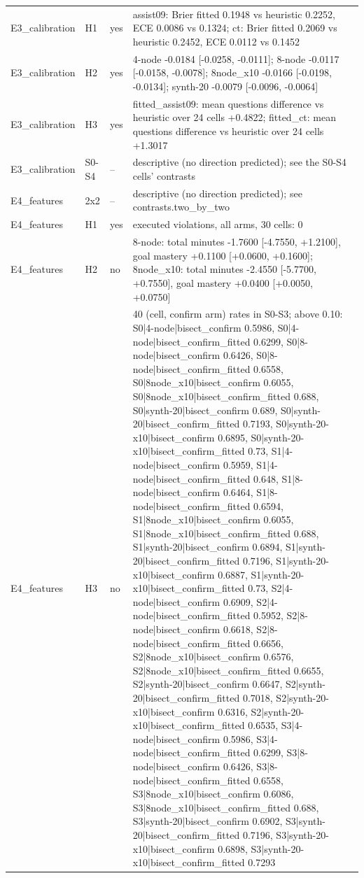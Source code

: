 \begin{table}[htbp]
\begin{tabular}{llll}
E3\_calibration & H1 & yes & assist09: Brier fitted 0.1948 vs heuristic 0.2252, ECE 0.0086 vs 0.1324; ct: Brier fitted 0.2069 vs heuristic 0.2452, ECE 0.0112 vs 0.1452 \\
E3\_calibration & H2 & yes & 4-node -0.0184 [-0.0258, -0.0111]; 8-node -0.0117 [-0.0158, -0.0078]; 8node\_x10 -0.0166 [-0.0198, -0.0134]; synth-20 -0.0079 [-0.0096, -0.0064] \\
E3\_calibration & H3 & yes & fitted\_assist09: mean questions difference vs heuristic over 24 cells +0.4822; fitted\_ct: mean questions difference vs heuristic over 24 cells +1.3017 \\
E3\_calibration & S0-S4 & -- & descriptive (no direction predicted); see the S0-S4 cells' contrasts \\
E4\_features & 2x2 & -- & descriptive (no direction predicted); see contrasts.two\_by\_two \\
E4\_features & H1 & yes & executed violations, all arms, 30 cells: 0 \\
E4\_features & H2 & no & 8-node: total minutes -1.7600 [-4.7550, +1.2100], goal mastery +0.1100 [+0.0600, +0.1600]; 8node\_x10: total minutes -2.4550 [-5.7700, +0.7550], goal mastery +0.0400 [+0.0050, +0.0750] \\
E4\_features & H3 & no & 40 (cell, confirm arm) rates in S0-S3; above 0.10: S0|4-node|bisect\_confirm 0.5986, S0|4-node|bisect\_confirm\_fitted 0.6299, S0|8-node|bisect\_confirm 0.6426, S0|8-node|bisect\_confirm\_fitted 0.6558, S0|8node\_x10|bisect\_confirm 0.6055, S0|8node\_x10|bisect\_confirm\_fitted 0.688, S0|synth-20|bisect\_confirm 0.689, S0|synth-20|bisect\_confirm\_fitted 0.7193, S0|synth-20-x10|bisect\_confirm 0.6895, S0|synth-20-x10|bisect\_confirm\_fitted 0.73, S1|4-node|bisect\_confirm 0.5959, S1|4-node|bisect\_confirm\_fitted 0.648, S1|8-node|bisect\_confirm 0.6464, S1|8-node|bisect\_confirm\_fitted 0.6594, S1|8node\_x10|bisect\_confirm 0.6055, S1|8node\_x10|bisect\_confirm\_fitted 0.688, S1|synth-20|bisect\_confirm 0.6894, S1|synth-20|bisect\_confirm\_fitted 0.7196, S1|synth-20-x10|bisect\_confirm 0.6887, S1|synth-20-x10|bisect\_confirm\_fitted 0.73, S2|4-node|bisect\_confirm 0.6909, S2|4-node|bisect\_confirm\_fitted 0.5952, S2|8-node|bisect\_confirm 0.6618, S2|8-node|bisect\_confirm\_fitted 0.6656, S2|8node\_x10|bisect\_confirm 0.6576, S2|8node\_x10|bisect\_confirm\_fitted 0.6655, S2|synth-20|bisect\_confirm 0.6647, S2|synth-20|bisect\_confirm\_fitted 0.7018, S2|synth-20-x10|bisect\_confirm 0.6316, S2|synth-20-x10|bisect\_confirm\_fitted 0.6535, S3|4-node|bisect\_confirm 0.5986, S3|4-node|bisect\_confirm\_fitted 0.6299, S3|8-node|bisect\_confirm 0.6426, S3|8-node|bisect\_confirm\_fitted 0.6558, S3|8node\_x10|bisect\_confirm 0.6086, S3|8node\_x10|bisect\_confirm\_fitted 0.688, S3|synth-20|bisect\_confirm 0.6902, S3|synth-20|bisect\_confirm\_fitted 0.7196, S3|synth-20-x10|bisect\_confirm 0.6898, S3|synth-20-x10|bisect\_confirm\_fitted 0.7293 \\

\end{tabular}
\end{table}
